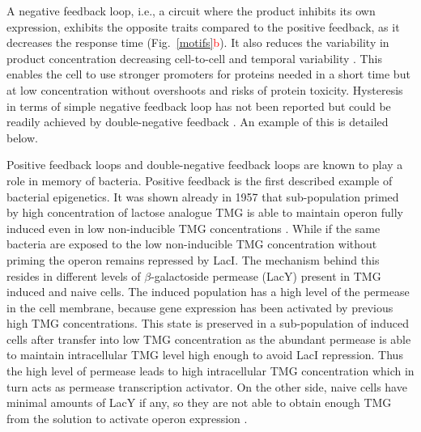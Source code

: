 A negative feedback loop, i.e., a circuit where the product inhibits its own expression, exhibits the opposite traits compared to the positive feedback, as it decreases the response time \cite{rosenfeld2002negative} (Fig.~\ref{motifs}\textcolor{red}{b}).
It also reduces the variability in product concentration decreasing cell-to-cell and temporal variability \cite{becskei2000engineering}.
This enables the cell to use stronger promoters for proteins needed in a short time but at low concentration without overshoots and risks of protein toxicity.
Hysteresis in terms of simple negative feedback loop has not been reported but could be readily achieved by double-negative feedback \cite{toman1985system}.
An example of this is detailed below.

Positive feedback loops and double-negative feedback loops are known to play a role in memory of bacteria.
Positive feedback is the first described example of bacterial epigenetics.
It was shown already in 1957 that  sub-population primed by high concentration of lactose analogue TMG is able to maintain  operon fully induced even in low non-inducible TMG concentrations \cite{novick1957enzyme}.
While if the same bacteria are exposed to the low non-inducible TMG concentration without priming the  operon remains repressed by LacI.
The mechanism behind this resides in different levels of $\beta$-galactoside permease (LacY) present in TMG induced and naive cells.
The induced population has a high level of the permease in the cell membrane, because  gene expression has been activated by previous high TMG concentrations.
This state is preserved in a sub-population of induced cells after transfer into low TMG concentration as the abundant permease is able to maintain intracellular TMG level high enough to avoid LacI repression.
Thus the high level of permease leads to high intracellular TMG concentration which in turn acts as permease transcription activator.
On the other side, naive cells have minimal amounts of LacY if any, so they are not able to obtain enough TMG from the solution to activate  operon expression \cite{smits2006phenotypic, casadesus2013programmed}.

